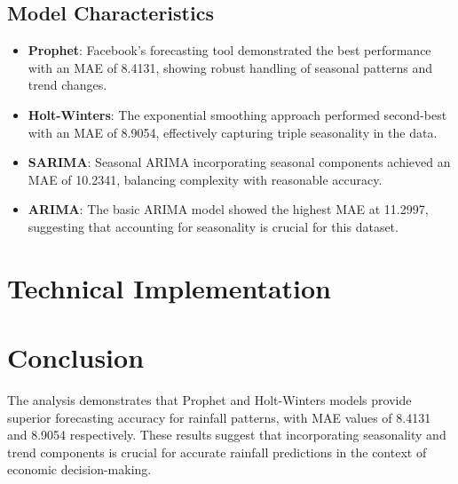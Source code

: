 \documentclass[12pt,a4paper]{article}
\begin{document}
\subsection{Model Characteristics}
\begin{itemize}
    \item \textbf{Prophet}: Facebook's forecasting tool demonstrated the best performance with an MAE of 8.4131, showing robust handling of seasonal patterns and trend changes.
    \item \textbf{Holt-Winters}: The exponential smoothing approach performed second-best with an MAE of 8.9054, effectively capturing triple seasonality in the data.
    \item \textbf{SARIMA}: Seasonal ARIMA incorporating seasonal components achieved an MAE of 10.2341, balancing complexity with reasonable accuracy.
    \item \textbf{ARIMA}: The basic ARIMA model showed the highest MAE at 11.2997, suggesting that accounting for seasonality is crucial for this dataset.
\end{itemize}

\section{Technical Implementation}

\section{Conclusion}
The analysis demonstrates that Prophet and Holt-Winters models provide superior forecasting accuracy for rainfall patterns, with MAE values of 8.4131 and 8.9054 respectively. These results suggest that incorporating seasonality and trend components is crucial for accurate rainfall predictions in the context of economic decision-making.
\end{document}
